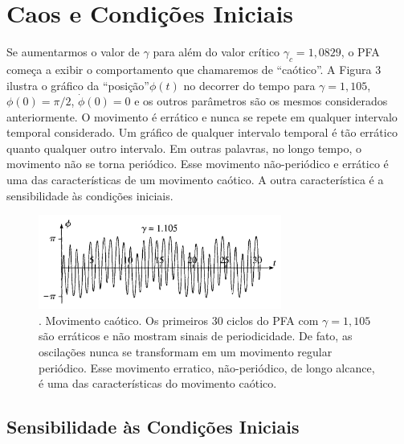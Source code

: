 \documentclass{article}
\begin{document}
\section{Caos e Condições Iniciais}

Se aumentarmos o valor de $\gamma$ para além do valor crítico $\gamma_c = 1,0829$, o PFA começa a exibir o comportamento que chamaremos de ``caótico''. A Figura 3 ilustra o gráfico da ``posição''$\phi(t)$ no decorrer do tempo para $\gamma = 1,105$, $\phi(0) =\pi/2$, $\dot{\phi}(0) = 0$ e os outros parâmetros são os mesmos considerados anteriormente. O movimento é errático e nunca se repete em qualquer intervalo temporal considerado. Um gráfico de qualquer intervalo temporal é tão errático quanto qualquer outro intervalo. Em outras palavras, no longo tempo, o movimento não se torna periódico. Esse movimento não-periódico e errático é uma das características de um movimento caótico. A outra característica é a sensibilidade às condições iniciais.


\begin{figure}[h]
\centering
\includegraphics[width=8cm]{pend1.png}
\captionsetup{labelsep=none}
\caption{. Movimento caótico. Os primeiros 30 ciclos do PFA com $\gamma = 1,105$ são erráticos e não mostram sinais de periodicidade. De fato, as oscilações nunca se transformam em um movimento regular periódico. Esse movimento erratico, não-periódico, de longo alcance, é uma das características do movimento caótico. }
\end{figure}

\subsection{Sensibilidade às Condições Iniciais}
\end{document}
